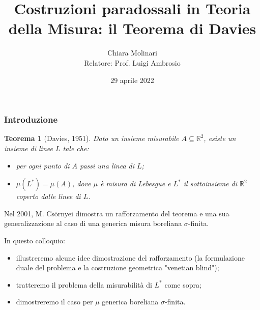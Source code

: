 \documentclass[11pt]{beamer} %
\author[Chiara Molinari]{Chiara Molinari\\[10mm] Relatore: Prof. Luigi Ambrosio}
\title[Il Teorema di Davies]{Costruzioni paradossali in Teoria della Misura: il Teorema di Davies}
\date{29 aprile 2022}
\newcommand{\R}{\mathbb{R}}
\newcommand{\<}{\langle}
\renewcommand{\>}{\rangle}
\theoremstyle{theorem}
\newtheorem{teo}{Teorema}
\theoremstyle{theorem}
\theoremstyle{theorem}
\theoremstyle{theorem}
\theoremstyle{theorem}
\begin{document}

\begin{frame}
	\maketitle
\end{frame}


\begin{frame}[fragile]
	\frametitle{Introduzione}
	\begin{teo}[Davies, 1951] Dato un insieme misurabile $A \subseteq \R^2$, esiste un insieme di linee $L$ tale che:\\
	\begin{itemize}	
	\item per ogni punto di $A$ passi una linea di $L$;\\
	\item $\mu(L^*)=\mu(A)$, dove $\mu$ è misura di Lebesgue e $L^*$ il sottoinsieme di $\R^2$ coperto dalle linee di $L$.
	\end{itemize}
	\end{teo}
	\pause
	
	Nel 2001, M. Cs{\"o}rnyei dimostra un rafforzamento del teorema e una sua generalizzazione al caso di una generica misura boreliana $\sigma$-finita. 
	\pause
	\medskip
	 
	In questo colloquio:\\
	\begin{itemize}
		\item illustreremo alcune idee dimostrazione del rafforzamento (la formulazione duale del problema e la costruzione geometrica "venetian blind");\\ \pause
		\item tratteremo il problema della misurabilità di $L^*$ come sopra;\\ \pause
		\item dimostreremo il caso per $\mu$ generica boreliana $\sigma$-finita. \pause
	\end{itemize}

\end{frame}
	
	
	
	
\end{document}
